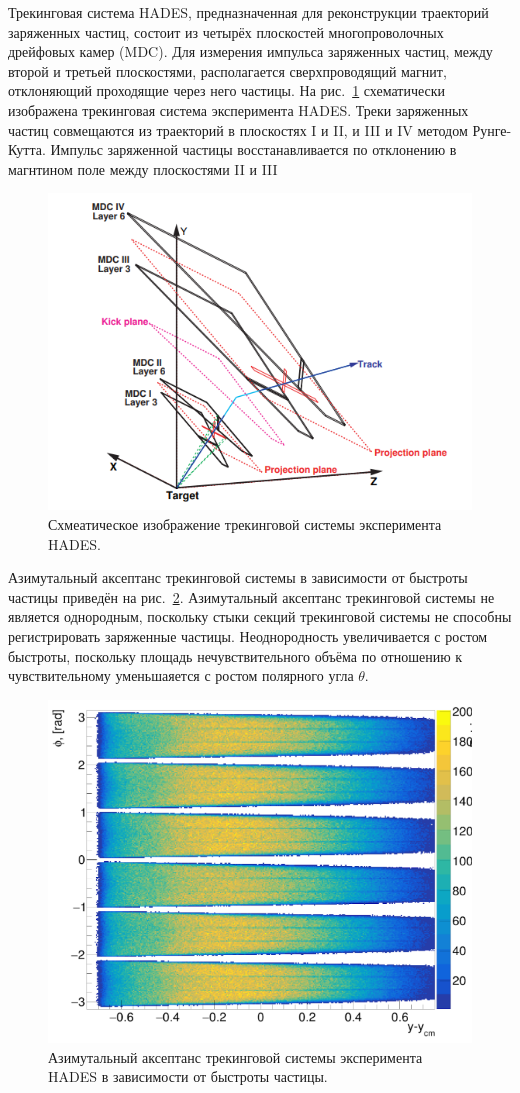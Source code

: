 Трекинговая система HADES, предназначенная для реконструкции траекторий заряженных частиц, состоит из четырёх плоскостей многопроволочных дрейфовых камер (MDC).
Для измерения импульса заряженных частиц, между второй и третьей плоскостями, располагается сверхпроводящий магнит, отклоняющий проходящие через него частицы.
На рис.~\ref{fig:hades_tracking} схематически изображена трекинговая система эксперимента HADES.
Треки заряженных частиц совмещаются из траекторий в плоскостях I и II, и III и IV методом Рунге-Кутта.
Импульс заряженной частицы восстанавливается по отклонению в магнтином поле между плоскостями II и III 
%
\begin{figure}[ht]
\begin{center}
    \includegraphics[width=0.55\linewidth]{images/hades_tracking_system.png}
    \caption{Схмеатическое изображение трекинговой системы эксперимента HADES.}
    \label{fig:hades_tracking}
\end{center}
\end{figure}

Азимутальный аксептанс трекинговой системы в зависимости от быстроты частицы приведён на рис.~\ref{fig:hades_phi_y}.
Азимутальный аксептанс трекинговой системы не является однородным, поскольку стыки секций трекинговой системы не способны регистрировать заряженные частицы.
Неоднородность увеличивается с ростом быстроты, поскольку площадь нечувствительного объёма по отношению к чувствительному уменьшаяется с ростом полярного угла $\theta$. 
%
\begin{figure}[ht]
\begin{center}
\includegraphics[width=0.55\linewidth]{images/hades_phi_y.png}
\caption{Азимутальный аксептанс трекинговой системы эксперимента HADES в зависимости от быстроты частицы.}
\label{fig:hades_phi_y}
\end{center}
\end{figure}

